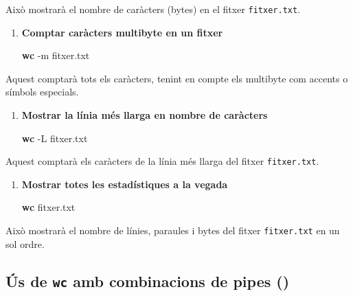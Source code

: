 \documentclass[
  12 pt,
  a4paper,
]{article}
\newenvironment{Shaded}{\begin{snugshade}}{\end{snugshade}}
\newcommand{\AttributeTok}[1]{\textcolor[rgb]{0.13,0.29,0.53}{#1}}
\newcommand{\FunctionTok}[1]{\textcolor[rgb]{0.13,0.29,0.53}{\textbf{#1}}}
\newcommand{\NormalTok}[1]{#1}
\begin{document}
Això mostrarà el nombre de caràcters (bytes) en el fitxer
\texttt{fitxer.txt}.

\begin{enumerate}
\def\labelenumi{\arabic{enumi}.}
\setcounter{enumi}{3}
\item
  \textbf{Comptar caràcters multibyte en un fitxer}

\begin{Shaded}
\begin{Highlighting}[]
\FunctionTok{wc} \AttributeTok{{-}m}\NormalTok{ fitxer.txt}
\end{Highlighting}
\end{Shaded}
\end{enumerate}

Aquest comptarà tots els caràcters, tenint en compte els multibyte com
accents o símbols especials.

\begin{enumerate}
\def\labelenumi{\arabic{enumi}.}
\setcounter{enumi}{4}
\item
  \textbf{Mostrar la línia més llarga en nombre de caràcters}

\begin{Shaded}
\begin{Highlighting}[]
\FunctionTok{wc} \AttributeTok{{-}L}\NormalTok{ fitxer.txt}
\end{Highlighting}
\end{Shaded}
\end{enumerate}

Aquest comptarà els caràcters de la línia més llarga del fitxer
\texttt{fitxer.txt}.

\begin{enumerate}
\def\labelenumi{\arabic{enumi}.}
\setcounter{enumi}{5}
\item
  \textbf{Mostrar totes les estadístiques a la vegada}

\begin{Shaded}
\begin{Highlighting}[]
\FunctionTok{wc}\NormalTok{ fitxer.txt}
\end{Highlighting}
\end{Shaded}
\end{enumerate}

Això mostrarà el nombre de línies, paraules i bytes del fitxer
\texttt{fitxer.txt} en un sol ordre.

\subsection{\texorpdfstring{Ús de \texttt{wc} amb combinacions de pipes
(\texttt{\textbar{}})}{Ús de wc amb combinacions de pipes (\textbar)}}\label{uxfas-de-wc-amb-combinacions-de-pipes}
\end{document}

